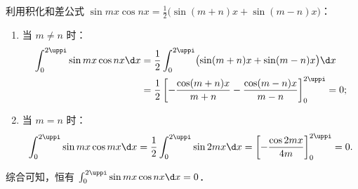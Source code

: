 \begin{myproof}

    利用积化和差公式 $\sin mx \cos nx = \frac{1}{2}\bigl(\sin(m+n)x + \sin(m-n)x\bigr)$：
    \begin{enumerate}
        \item 当 $m \neq n$ 时：
              \begin{equation}
                  \begin{aligned}
                      \int_0^{2\uppi} \sin mx \cos nx \d x & = \frac{1}{2} \int_0^{2\uppi} \bigl(\sin(m+n)x + \sin(m-n)x\bigr) \d x                        \\
                                                           & = \frac{1}{2} \left[ -\frac{\cos(m+n)x}{m+n} - \frac{\cos(m-n)x}{m-n} \right]_0^{2\uppi} = 0;
                  \end{aligned}
              \end{equation}
        \item 当 $m = n$ 时：
              \begin{equation}
                  \int_0^{2\uppi} \sin mx \cos mx \d x = \frac{1}{2}\int_0^{2\uppi} \sin 2mx \d x = \left[ -\frac{\cos 2mx}{4m} \right]_0^{2\uppi} = 0.
              \end{equation}
    \end{enumerate}
    综合可知，恒有 $\int_0^{2\uppi} \sin mx \cos nx \d x = 0$．



\end{myproof}

